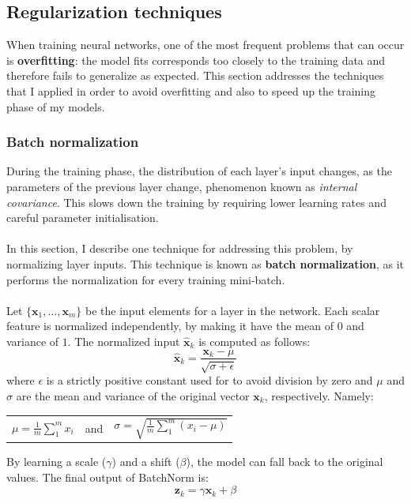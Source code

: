 	\subsection{Regularization techniques} \label{Section: impl/ml/reg}
	When training neural networks, one of the most frequent problems that can occur is \textbf{overfitting}: the model fits corresponds too closely to the training data and therefore fails to generalize as expected. This section addresses the techniques that I applied in order to avoid overfitting and also to speed up the training phase of my models.  
	\subsubsection{Batch normalization} \label{Section: impl/ml/reg/batch}
	During the training phase, the distribution of each layer's input changes, as the parameters of the previous layer change, phenomenon known as \textit{internal covariance}. This slows down the training by requiring lower learning rates and careful parameter initialisation. 
	\\ \\
	In this section, I describe one technique for addressing this problem, by normalizing layer inputs. This technique is known as \textbf{batch normalization}\cite{DBLP:journals/corr/IoffeS15}, as it performs the normalization for every training mini-batch. 
	\\ \\
	Let $\{ \mathbf{x}_1, \dots, \mathbf{x}_m  \}$ be the input elements for a layer in the network. Each scalar feature is normalized independently, by making it have the mean of $0$ and variance of $1$.  The normalized input $\mathbf{\hat{x}}_k$ is computed as follows:
	\begin{equation}
		\mathbf{\hat{x}}_k = \frac{\mathbf{x}_k - \mu}{\sqrt{\sigma + \epsilon}}
	\end{equation}
	where $\epsilon$ is a strictly positive constant used for to avoid division by zero and $\mu$ and $\sigma$ are the mean and variance of the original vector $\mathbf{x}_k$, respectively. Namely:
	\begin{longtable}{ccc}

				$\mu = \frac{1}{m} \sum_{1}^{m} x_i$

			&   and   &

				$\sigma = \sqrt{\frac{1}{m}\sum_{1}^{m}(x_i - \mu)}$

	\end{longtable}
	By learning a scale ($\gamma$) and a shift ($\beta$), the model can fall back to the original values. The final output of BatchNorm is: 
	\begin{equation}
		\mathbf{z}_k = \gamma \mathbf{\hat{x}}_k + \beta
	\end{equation} 
